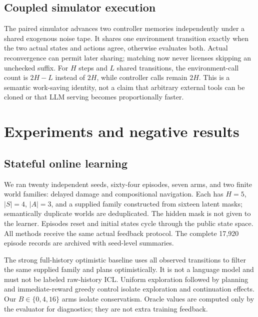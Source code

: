\documentclass[10pt,twocolumn]{article}
\begin{document}
\subsection{Coupled simulator execution}
The paired simulator advances two controller memories independently under a shared
exogenous noise tape. It shares one environment transition exactly when the two
actual states and actions agree, otherwise evaluates both. Actual reconvergence
can permit later sharing; matching now never licenses skipping an unchecked suffix.
For $H$ steps and $L$ shared transitions, the environment-call count is $2H-L$
instead of $2H$, while controller calls remain $2H$. This is a semantic work-saving
identity, not a claim that arbitrary external tools can be cloned or that LLM
serving becomes proportionally faster.

\section{Experiments and negative results}
\subsection{Stateful online learning}
We ran twenty independent seeds, sixty-four episodes, seven arms, and two finite
world families: delayed damage and compositional navigation. Each has $H=5$,
$|S|=4$, $|A|=3$, and a supplied family constructed from sixteen latent masks;
semantically duplicate worlds are deduplicated. The hidden mask is not given to
the learner. Episodes reset and initial states cycle through the public state
space. All methods receive the same actual feedback protocol. The complete
17,920 episode records are archived with seed-level summaries.

\begin{table}[t]
\centering\small

\caption{Executed finite-world experiment, means over twenty seeds. Early and late
are the first eight and final sixteen episodes. Worst deficit is the maximum
cumulative anchor-relative deficit over all completed prefixes and seeds, in
native reward units. This is a model-based mechanism study, not an ICL or LLM
benchmark. Seed-level variability is retained in the result ledger.}
\label{tab:continuation}
\end{table}

The strong full-history optimistic baseline uses all observed transitions to filter
the same supplied family and plans optimistically. It is not a language model and
must not be labeled raw-history ICL. Uniform exploration followed by planning and
immediate-reward greedy control isolate exploration and continuation effects.
Our $B\in\{0,4,16\}$ arms isolate conservatism. Oracle values are computed only
by the evaluator for diagnostics; they are not extra training feedback.
\end{document}
